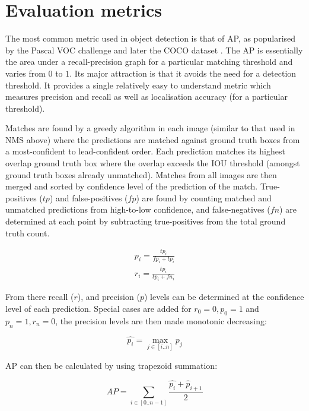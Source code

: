 \section{Evaluation metrics}
\label{sec:evaluation_metrics}

The most common metric used in object detection is that of \gls{AP}, as popularised by the Pascal VOC challenge \cite{Everingham2008} and later the COCO dataset \cite{Lin2014}. The \gls{AP} is essentially the area under a recall-precision graph for a particular matching threshold and varies from $0$  to $1$. Its major attraction is that it avoids the need for a detection threshold. It provides a single relatively easy to understand metric which measures precision and recall as well as localisation accuracy (for a particular threshold).

Matches are found by a greedy algorithm in each image (similar to that used in \gls{NMS} above) where the predictions are matched against ground truth boxes from a most-confident to lead-confident order. Each prediction matches its highest overlap ground truth box where the overlap exceeds the \gls{IOU} threshold (amongst ground truth boxes already unmatched). Matches from all images are then merged and sorted by confidence level of the prediction of the match. True-positives ($tp$) and false-positives ($fp$) are found by counting matched and unmatched predictions from high-to-low confidence, and false-negatives ($fn$) are determined at each point by subtracting true-positives from the total ground truth count. 

\begin{equation*}
\begin{split}
p_i = \frac{tp_i}{fp_i + tp_i}\\
r_i = \frac{tp_i}{tp_i + fn_i}
\end{split}
\end{equation*}

From there recall ($r$), and precision ($p$) levels can be determined at the confidence level of each prediction. Special cases are added for $r_0=0, p_0=1$ and $p_n=1, r_n=0$, the precision levels are then made monotonic decreasing:

\begin{equation}
\hat{p_i} = \max_{j \in [i..n]}{p_j}
\end{equation}

\gls{AP} can then be calculated by using trapezoid summation:

\begin{equation}
AP = \sum_{i \in [0..n-1]}\frac{\hat{p_i} + \hat{p}_{i + 1}}{2}
\end{equation}


